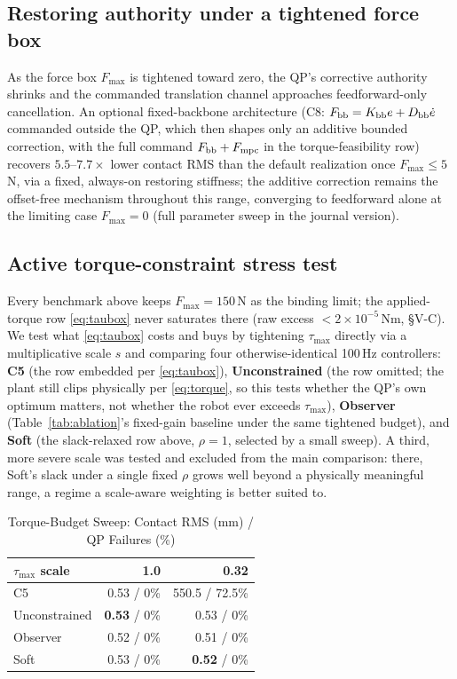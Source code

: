\documentclass[conference]{IEEEtran}
\newcommand{\Fmpc}{F_{\mathrm{mpc}}}
\begin{document}
\subsection{Restoring authority under a tightened force box}

As the force box $F_{\max}$ is tightened toward zero, the QP's corrective
authority shrinks and the commanded translation channel approaches
feedforward-only cancellation. An optional fixed-backbone
architecture (C8: $F_{\rm bb}=K_{\rm bb}e+D_{\rm bb}\dot e$ commanded outside
the QP, which then shapes only an additive bounded correction, with the
full command $F_{\rm bb}+\Fmpc$ in the torque-feasibility row) recovers
$5.5$--$7.7\times$ lower contact RMS than the default realization once
$F_{\max}\le5$\,N, via a fixed, always-on restoring stiffness; the
additive correction remains the offset-free mechanism throughout this
range, converging to feedforward alone at the limiting case $F_{\max}=0$
(full parameter sweep in the journal version).

\subsection{Active torque-constraint stress test}
\label{sec:tauactive}

Every benchmark above keeps $F_{\max}=150$\,N as the binding limit; the
applied-torque row \eqref{eq:taubox} never saturates there (raw excess
$<2\times10^{-5}$\,Nm, \S V-C). We test what \eqref{eq:taubox} costs and
buys by tightening $\tau_{\max}$ directly via a multiplicative scale $s$
and comparing four otherwise-identical 100\,Hz controllers: \textbf{C5}
(the row embedded per \eqref{eq:taubox}), \textbf{Unconstrained} (the row
omitted; the plant still clips physically per \eqref{eq:torque}, so this
tests whether the QP's own optimum matters, not whether the robot ever
exceeds $\tau_{\max}$), \textbf{Observer} (Table~\ref{tab:ablation}'s
fixed-gain baseline under the same tightened budget), and \textbf{Soft}
(the slack-relaxed row above, $\rho=1$, selected by a small sweep). A
third, more severe scale was tested and excluded from the main
comparison: there, Soft's slack under a single fixed $\rho$ grows well
beyond a physically meaningful range, a regime a scale-aware weighting
is better suited to.

\begin{table}[t]
\caption{Torque-Budget Sweep: Contact RMS (mm) / QP Failures (\%)}
\label{tab:tauactive}
\centering
\footnotesize
\setlength{\tabcolsep}{4.5pt}
\begin{tabular}{@{}lrr@{}}
\toprule
$\tau_{\max}$ scale & 1.0 & 0.32\\
\midrule
C5 & 0.53 / 0\% & 550.5 / 72.5\%\\
Unconstrained & \textbf{0.53} / 0\% & 0.53 / 0\%\\
Observer & 0.52 / 0\% & 0.51 / 0\%\\
Soft & 0.53 / 0\% & \textbf{0.52} / 0\%\\
\bottomrule
\end{tabular}
\end{table}
\end{document}
